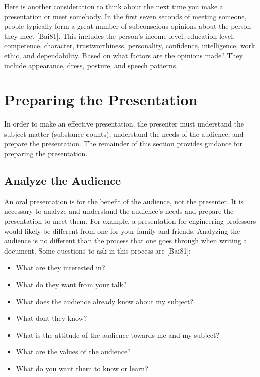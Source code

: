 Here is another consideration to think about the next time you make a
presentation or meet somebody. In the first seven seconds of meeting
someone, people typically form a great number of subconscious opinions
about the person they meet {[}Bai81{]}. This includes the person's
income level, education level, competence, character, trustworthiness,
personality, confidence, intelligence, work ethic, and dependability.
Based on what factors are the opinions made? They include appearance,
dress, posture, and speech patterns.

\section{Preparing the Presentation}
\label{section:preparing-the-presentation}

In order to make an effective presentation, the presenter must
understand the subject matter (substance counts), understand the needs
of the audience, and prepare the presentation. The remainder of this
section provides guidance for preparing the presentation.

\subsection*{Analyze the Audience}
\label{subsection:analyze-the-audience}


An oral presentation is for the benefit of the audience, not the
presenter. It is necessary to analyze and understand the audience's
needs and prepare the presentation to meet them. For example, a
presentation for engineering professors would likely be different from
one for your family and friends. Analyzing the audience is no different
than the process that one goes through when writing a document. Some
questions to ask in this process are {[}Bai81{]}:

\begin{itemize}
\item
  What are they interested in?
\item
  What do they want from your talk?
\item
  What does the audience already know about my subject?
\item
  What don\textquotesingle t they know?
\item
  What is the attitude of the audience towards me and my subject?
\item
  What are the values of the audience?
\item
  What do you want them to know or learn?
\end{itemize}

